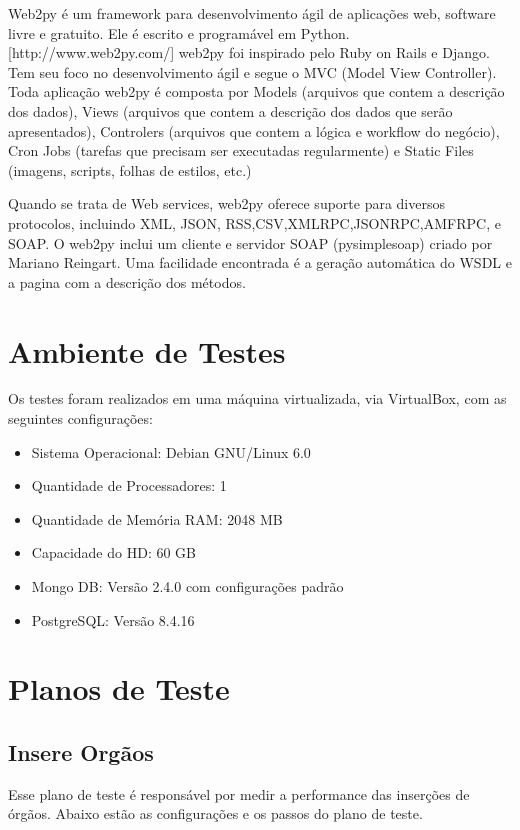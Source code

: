 Web2py é um framework para desenvolvimento ágil de aplicações web, software livre e gratuito. Ele é escrito e programável em Python. [http://www.web2py.com/] web2py foi inspirado pelo Ruby on Rails e Django. Tem seu foco no desenvolvimento ágil e segue o MVC (Model View Controller). Toda aplicação web2py é composta por Models (arquivos que contem a descrição dos dados), Views (arquivos que contem a descrição dos dados que serão apresentados), Controlers (arquivos que contem a lógica e workflow do negócio), Cron Jobs (tarefas que precisam ser executadas regularmente) e Static Files (imagens, scripts, folhas de estilos, etc.)

Quando se trata de Web services, web2py oferece suporte para diversos protocolos, incluindo XML, JSON, RSS,CSV,XMLRPC,JSONRPC,AMFRPC, e SOAP.  O web2py inclui um cliente e servidor SOAP (pysimplesoap) criado por Mariano Reingart. Uma facilidade encontrada é a geração automática do WSDL e a pagina com a descrição dos métodos.


\chapter {Ambiente de Testes}

Os testes foram realizados em uma máquina virtualizada, via VirtualBox, com as seguintes configurações:

\begin{itemize}
\item Sistema Operacional: Debian GNU/Linux 6.0
\item Quantidade de Processadores: 1 
\item Quantidade de Memória RAM: 2048 MB
\item Capacidade do HD: 60 GB
\item Mongo DB: Versão 2.4.0 com configurações padrão
\item PostgreSQL: Versão 8.4.16
\end{itemize}



\chapter{Planos de Teste}

\section{Insere Orgãos}

Esse plano de teste é responsável por medir a performance das inserções de órgãos. Abaixo estão as configurações e os passos do plano de teste.


